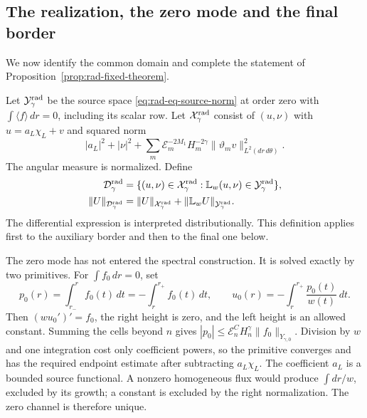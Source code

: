 \subsection{The realization, the zero mode and the final border}

We now identify the common domain and complete the statement of
Proposition~\ref{prop:rad-fixed-theorem}.

\begin{definition}\label{def:radial-graph-domain}
Let $\mathcal Y_\gamma^{\rm rad}$ be the source space
\eqref{eq:rad-eq-source-norm} at order zero with
$\int\langle f\rangle\,dr=0$, including its scalar row.
Let $\mathcal X_\gamma^{\rm rad}$ consist of $(u,\nu)$ with
$u=a_L\chi_L+v$ and squared norm
\[
 |a_L|^2+|\nu|^2+
 \sum_m\mathcal E_m^{-2M_1}H_m^{-2\gamma}
               \|\vartheta_mv\|_{L^2(dr\,d\theta)}^2.
\]
The angular measure is normalized.  Define
\[
 \begin{aligned}
 \mathcal D_\gamma^{\rm rad}
 &=\{(u,\nu)\in\mathcal X_\gamma^{\rm rad}:
          \mathbb L_w(u,\nu)\in\mathcal Y_\gamma^{\rm rad}\},\\
 \|U\|_{\mathcal D_\gamma^{\rm rad}}
   &=\|U\|_{\mathcal X_\gamma^{\rm rad}}
        +\|\mathbb L_wU\|_{\mathcal Y_\gamma^{\rm rad}}.
 \end{aligned}
\]
The differential expression is interpreted distributionally.  This
definition applies first to the auxiliary border and then to the final
one below.
\end{definition}

The zero mode has not entered the spectral construction.  It is solved
exactly by two primitives.  For $\int f_0\,dr=0$, set
\begin{equation}\label{eq:rad-eq-rm49}
 p_0(r)=\int_{r_-}^r f_0(t)\,dt=-\int_r^{r_+}f_0(t)\,dt,\qquad
 u_0(r)=-\int_r^{r_+}\frac{p_0(t)}{w(t)}\,dt.
\end{equation}
Then $(wu_0')'=f_0$, the right height is zero, and the left height is
an allowed constant.  Summing the cells beyond $n$ gives
$|p_0|\le\mathcal E_n^CH_n^\gamma\|f_0\|_{Y_{\gamma,0}}$.
Division by $w$ and one integration cost only coefficient powers, so
the primitive converges and has the required endpoint estimate after
subtracting $a_L\chi_L$.  The coefficient $a_L$ is a bounded source
functional.  A nonzero homogeneous flux would produce
$\int dr/w$, excluded by its growth; a constant is excluded by the
right normalization.  The zero channel is therefore unique.

